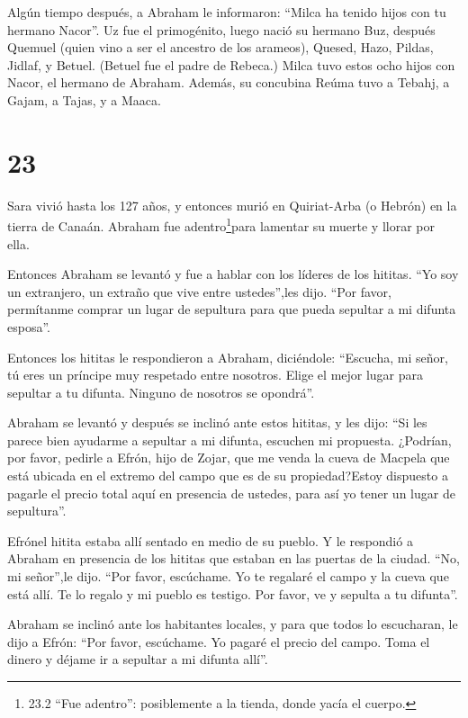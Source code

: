  Algún tiempo después, a Abraham le informaron: ``Milca ha
tenido hijos con tu hermano Nacor''.  Uz fue el
primogénito, luego nació su hermano Buz, después Quemuel (quien vino a
ser el ancestro de los arameos),  Quesed, Hazo, Pildas,
Jidlaf, y Betuel.  (Betuel fue el padre de Rebeca.) Milca
tuvo estos ocho hijos con Nacor, el hermano de Abraham. 
Además, su concubina Reúma tuvo a Tebahj, a Gajam, a Tajas, y a Maaca.

\hypertarget{section-22}{%
\section{23}\label{section-22}}

 Sara vivió hasta los 127 años,  y entonces
murió en Quiriat-Arba (o Hebrón) en la tierra de Canaán. Abraham fue
adentro\footnote{23.2 ``Fue adentro'': posiblemente a la tienda, donde
  yacía el cuerpo.}para lamentar su muerte y llorar por ella.

 Entonces Abraham se levantó y fue a hablar con los líderes
de los hititas.  ``Yo soy un extranjero, un extraño que vive
entre ustedes'',les dijo. ``Por favor, permítanme comprar un lugar de
sepultura para que pueda sepultar a mi difunta esposa''.

 Entonces los hititas le respondieron a Abraham, diciéndole:
 ``Escucha, mi señor, tú eres un príncipe muy respetado
entre nosotros. Elige el mejor lugar para sepultar a tu difunta. Ninguno
de nosotros se opondrá''.

 Abraham se levantó y después se inclinó ante estos hititas,
 y les dijo: ``Si les parece bien ayudarme a sepultar a mi
difunta, escuchen mi propuesta. ¿Podrían, por favor, pedirle a Efrón,
hijo de Zojar,  que me venda la cueva de Macpela que está
ubicada en el extremo del campo que es de su propiedad?Estoy dispuesto a
pagarle el precio total aquí en presencia de ustedes, para así yo tener
un lugar de sepultura''.

 Efrónel hitita estaba allí sentado en medio de su pueblo.
Y le respondió a Abraham en presencia de los hititas que estaban en las
puertas de la ciudad.  ``No, mi señor'',le dijo. ``Por
favor, escúchame. Yo te regalaré el campo y la cueva que está allí. Te
lo regalo y mi pueblo es testigo. Por favor, ve y sepulta a tu
difunta''.

 Abraham se inclinó ante los habitantes locales,
 y para que todos lo escucharan, le dijo a Efrón: ``Por
favor, escúchame. Yo pagaré el precio del campo. Toma el dinero y déjame
ir a sepultar a mi difunta allí''.

